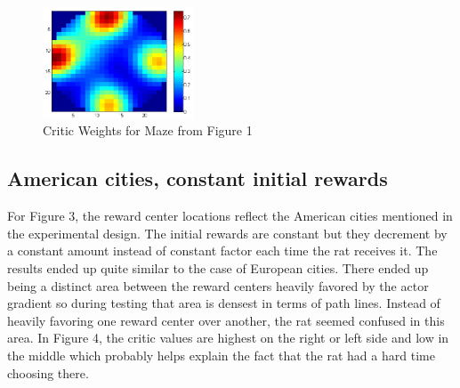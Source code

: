 \documentclass[conference]{IEEEtran}
\begin{document}
\begin{figure}
\includegraphics[width=0.4\textwidth]{waterMazeRevised2_Critic.png} 
\caption{Critic Weights for Maze from Figure 1}
\end{figure}

\subsection{American cities, constant initial rewards}

For Figure 3, the reward center locations reflect the American cities mentioned in the experimental design. The initial rewards are constant but they decrement by a constant amount instead of constant factor each time the rat receives it. The results ended up quite similar to the case of European cities. There ended up being a distinct area between the reward centers heavily favored by the actor gradient so during testing that area is densest in terms of path lines. Instead of heavily favoring one reward center over another, the rat seemed confused in this area. In Figure 4, the critic values are highest on the right or left side and low in the middle which probably helps explain the fact that the rat had a hard time choosing there.
\end{document}
